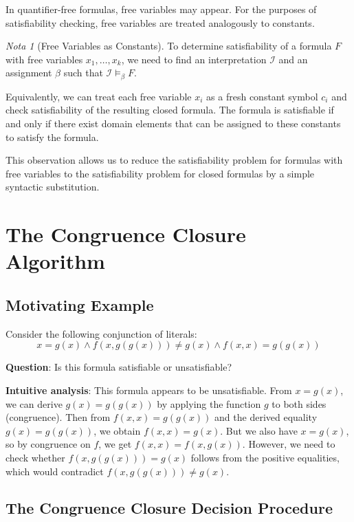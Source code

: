 \documentclass[11pt,a4paper]{article}
\theoremstyle{definition}
\theoremstyle{plain}
\theoremstyle{remark}
\newtheorem*{remark}{Nota}
\begin{document}
In quantifier-free formulas, free variables may appear. For the purposes of satisfiability checking, free variables are treated analogously to constants.

\begin{remark}[Free Variables as Constants]
To determine satisfiability of a formula $F$ with free variables $x_1, \dots, x_k$, we need to find an interpretation $\mathcal{I}$ and an assignment $\beta$ such that $\mathcal{I} \models_\beta F$.

Equivalently, we can treat each free variable $x_i$ as a fresh constant symbol $c_i$ and check satisfiability of the resulting closed formula. The formula is satisfiable if and only if there exist domain elements that can be assigned to these constants to satisfy the formula.
\end{remark}

This observation allows us to reduce the satisfiability problem for formulas with free variables to the satisfiability problem for closed formulas by a simple syntactic substitution.

\section{The Congruence Closure Algorithm}

\subsection{Motivating Example}

Consider the following conjunction of literals:
\[
x = g(x) \wedge f(x, g(g(x))) \neq g(x) \wedge f(x, x) = g(g(x))
\]

\textbf{Question}: Is this formula satisfiable or unsatisfiable?

\textbf{Intuitive analysis}: This formula appears to be unsatisfiable. From $x = g(x)$, we can derive $g(x) = g(g(x))$ by applying the function $g$ to both sides (congruence). Then from $f(x, x) = g(g(x))$ and the derived equality $g(x) = g(g(x))$, we obtain $f(x, x) = g(x)$. But we also have $x = g(x)$, so by congruence on $f$, we get $f(x, x) = f(x, g(x))$. However, we need to check whether $f(x, g(g(x))) = g(x)$ follows from the positive equalities, which would contradict $f(x, g(g(x))) \neq g(x)$.

\subsection{The Congruence Closure Decision Procedure}
\end{document}
